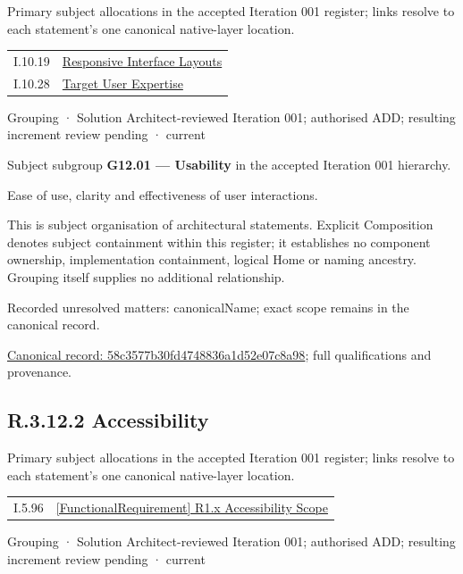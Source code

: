 Primary subject allocations in the accepted Iteration 001 register; links resolve to each statement’s one canonical native-layer location.\par
\begin{longtable}{p{.22\linewidth}p{.73\linewidth}}
I.10.19 & \hyperref[element:2e276eda09a94670bee0619468947895]{Responsive Interface Layouts} \\
I.10.28 & \hyperref[element:1c0b0e15434d47b1b08ad86e087a45d1]{Target User Expertise} \\
\end{longtable}
\label{element:58c3577b30fd4748836a1d52e07c8a98}
{\small Grouping · Solution Architect-reviewed Iteration 001; authorised ADD; resulting increment review pending · current}\par

Subject subgroup \textbf{G12.01 — Usability} in the accepted Iteration 001 hierarchy.



Ease of use, clarity and effectiveness of user interactions.



This is subject organisation of architectural statements. Explicit Composition denotes subject containment within this register; it establishes no component ownership, implementation containment, logical Home or naming ancestry. Grouping itself supplies no additional relationship.


{\small Recorded unresolved matters: canonicalName; exact scope remains in the canonical record.}\par
{\footnotesize \href{../../../../continuum/grouping/58c3577b30fd4748836a1d52e07c8a98.md}{Canonical record: 58c3577b30fd4748836a1d52e07c8a98}; full qualifications and provenance.}\par
\subsection*{R.3.12.2 Accessibility}
\label{navigation:R.3.12.2}

Primary subject allocations in the accepted Iteration 001 register; links resolve to each statement’s one canonical native-layer location.\par
\begin{longtable}{p{.22\linewidth}p{.73\linewidth}}
I.5.96 & \hyperref[element:8369e22bc3414ae49a1987095549ef03]{[FunctionalRequirement] R1.x Accessibility Scope} \\
\end{longtable}
\label{element:f814f4598722425cb3e7f45c32c11c90}
{\small Grouping · Solution Architect-reviewed Iteration 001; authorised ADD; resulting increment review pending · current}\par

